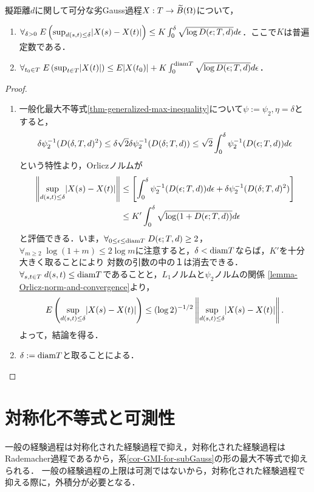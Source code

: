 \documentclass[uplatex,dvipdfmx]{jsreport}
\begin{document}
\begin{corollary}[劣Gauss過程に関する一般化最大不等式]\label{cor-GMI-for-subGauss}
    擬距離$d$に関して可分な劣Gauss過程$X:T\to\widetilde{B}(\Omega)$について，
    \begin{enumerate}
        \item $\forall_{\delta>0}\;E\left(\sup_{d(s,t)\le\delta}\lvert X(s)-X(t)\rvert\right)\le K\int^\delta_0\sqrt{\log D(\epsilon;T,d)}d\epsilon$．ここで$K$は普遍定数である．
        \item $\forall_{t_0\in T}\;E\left(\sup_{t\in T}\lvert X(t)\rvert\right)\le E\lvert X(t_0)\rvert+K\int^{\mathrm{diam} T}_0\sqrt{\log D(\epsilon;T,d)}d\epsilon$．
    \end{enumerate}
\end{corollary}
\begin{proof}\mbox{}
    \begin{enumerate}
        \item 一般化最大不等式\ref{thm-generalized-max-inequality}について$\psi:=\psi_2,\eta=\delta$とすると，
        \[\delta\psi_2^{-1}(D(\delta,T,d)^2)\le\delta\sqrt{2}\delta\psi_2^{-1}(D(\delta;T,d))\le\sqrt{2}\int^\delta_0\psi^{-1}_2(D(\epsilon;T,d))d\epsilon\]
        という特性より，Orliczノルムが
        \begin{align*}
            \left\|\sup_{d(s,t)\le\delta}\lvert X(s)-X(t)\rvert\right\|&\le\left[\int^\delta_0\psi^{-1}_2(D(\epsilon;T,d))d\epsilon+\delta\psi^{-1}_2(D(\delta;T,d)^2)\right]\\
            &\le K'\int^\delta_0\sqrt{\log(1+D(\epsilon;T,d))}d\epsilon
        \end{align*}
        と評価できる．いま，$\forall_{0\le\epsilon\le\mathrm{diam} T}\;D(\epsilon;T,d)\ge 2$，$\forall_{m\ge 2}\;\log(1+m)\le 2\log m$に注意すると，$\delta<\mathrm{diam} T$ならば，$K'$を十分大きく取ることにより
        対数の引数の中の１は消去できる．
        $\forall_{s,t\in T}\;d(s,t)\le\mathrm{diam} T$であることと，$L_1$ノルムと$\psi_2$ノルムの関係
        \ref{lemma-Orlicz-norm-and-convergence}より，
        \[E\left(\sup_{d(s,t)\le\delta}\lvert X(s)-X(t)\rvert\right)\le(\log2)^{-1/2}\left\|\sup_{d(s,t)\le\delta}\lvert X(s)-X(t)\rvert\right\|.\]
        よって，結論を得る．
        \item $\delta:=\mathrm{diam} T$と取ることによる．
    \end{enumerate}
\end{proof}

\section{対称化不等式と可測性}

\begin{tcolorbox}[colframe=ForestGreen, colback=ForestGreen!10!white,breakable,colbacktitle=ForestGreen!40!white,coltitle=black,fonttitle=\bfseries\sffamily,
title=対称化という技法]
    一般の経験過程は対称化された経験過程で抑え，対称化された経験過程はRademacher過程であるから，系\ref{cor-GMI-for-subGauss}の形の最大不等式で抑えられる．
    一般の経験過程の上限は可測ではないから，対称化された経験過程で抑える際に，外積分が必要となる．
\end{tcolorbox}
\end{document}
